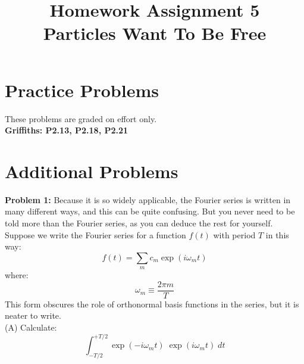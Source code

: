\documentclass[12pt]{article}
\begin{document}
\newcommand{\ihbar}{\ensuremath{i \hbar}}
\newcommand{\dPsidt}{\ensuremath{ \frac{\partial \Psi}{\partial t} }}
\newcommand{\dPsidx}{\ensuremath{ \frac{\partial \Psi}{\partial x} }}
\newcommand{\ddPsidx}{\ensuremath{ \frac{\partial^2 \Psi}{\partial x^2} }}
\newcommand{\dPssdt}{\ensuremath{ \frac{\partial \Psi^*}{\partial t} }}
\newcommand{\dPssdx}{\ensuremath{ \frac{\partial \Psi^*}{\partial x} }}
\newcommand{\ddPssdx}{\ensuremath{ \frac{\partial^2 \Psi^*}{\partial x^2} }}

\newcommand{\dphidt}{\ensuremath{ \frac{d \phi}{dt} }}
\newcommand{\dpsidx}{\ensuremath{ \frac{d \psi}{dx} }}
\newcommand{\ddpsidx}{\ensuremath{ \frac{d^2 \psi}{dx^2} }}


\date{\vspace{-5ex}}

\title{Homework Assignment 5 \\ Particles Want To Be Free}

\maketitle

\section*{Practice Problems}

These problems are graded on effort only.\\

\noindent
{\bf Griffiths: P2.13, P2.18, P2.21} \\

\section*{Additional Problems}

\noindent
{\bf Problem 1:} Because it is so widely applicable, the Fourier series is written in many different ways, and this can be quite confusing.  But you never need to be told more than the Fourier series, as you can deduce the rest for yourself.  Suppose we write the Fourier series for a function $f(t)$ with period $T$ in this way:
$$f(t) = \sum_m c_m \exp(i \omega_m t)$$
where:
$$\omega_m \equiv \frac{2 \pi m}{T}$$
This form obscures the role of orthonormal basis functions in the series, but it is neater to write.\\

\noindent
(A) Calculate:
$$ \int_{-T/2}^{+T/2} \exp(-i \omega_m t) \; \exp(i \omega_m t)  \; dt $$
\end{document}

